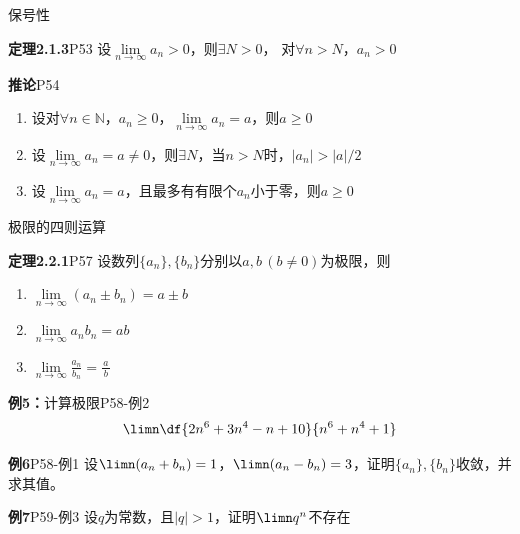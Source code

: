\begin{frame}{保号性}
	\linespread{1.4}\pause 
	\begin{block}{{\bf 定理2.1.3}\hfill P53}\pause 
		设$\lim\limits_{n\to\infty}a_n>0$，\pause 则$\exists N>0$，\pause
		对$\forall n>N$，$a_n>0$ \end{block}\pause 
	\begin{block}{{\bf 推论}\hfill P54}\pause 
		\begin{enumerate}
		  \item 设对$\forall n\in\mathbb{N}$，$a_n\geq
		  0$，\pause $\lim\limits_{n\to\infty}a_n=a$，\pause 则$a\geq 0$\pause 
		  \item 设$\lim\limits_{n\to\infty}a_n=a\ne
		  0$，\pause 则$\exists N$，当$n>N$时，$|a_n|>|a|/2$\pause 
		  \item
		  设$\lim\limits_{n\to\infty}a_n=a$，\pause 且最多有有限个$a_n$小于零，\pause 则$a\geq 0$
		\end{enumerate}	
	\end{block}
\end{frame}

\begin{frame}{极限的四则运算}
	\linespread{1.4}\pause 
	\begin{block}{{\bf 定理2.2.1}\hfill P57}\pause 
		设数列$\{a_n\},\{b_n\}$分别以$a,b\,(b\ne 0)$为极限，\pause 则
		\begin{enumerate}
		  \item $\lim\limits_{n\to\infty}(a_n\pm b_n)=a\pm b$\pause 
		  \item $\lim\limits_{n\to\infty}a_nb_n=ab$\pause 
		  \item
		  $\lim\limits_{n\to\infty}\displaystyle\frac{a_n}{b_n}=\displaystyle\frac{a}{\,b\,}$
		\end{enumerate}
	\end{block}\pause 
	\begin{exampleblock}{{\bf 例5：}计算极限\hfill P58-例2}
		$$\limn\df{2n^6+3n^4-n+10}{n^6+n^4+1}$$
	\end{exampleblock}
\end{frame}

\begin{frame}
	\linespread{2}\pause 
	\begin{exampleblock}{{\bf 例6}\hfill P58-例1}
		设$\limn(a_n+b_n)=1$，$\limn(a_n-b_n)=3$，证明$\{a_n\},\{b_n\}$收敛，并求其值。
	\end{exampleblock}
	\bigskip\pause 
	\begin{exampleblock}{{\bf 例7}\hfill P59-例3}
		设$q$为常数，且$|q|>1$，证明$\limn q^n$不存在
	\end{exampleblock}
\end{frame}

